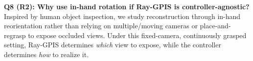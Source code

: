 \documentclass[conference]{IEEEtran}
\newcommand{\newparagraph}[1]{{\bf #1.}}
\begin{document}
\textbf{Q8 (R2): Why use in-hand rotation if Ray-GPIS is controller-agnostic?}
Inspired by human object inspection, we study reconstruction through in-hand reorientation rather than relying on multiple/moving cameras or place-and-regrasp to expose occluded views. Under this fixed-camera, continuously grasped setting, Ray-GPIS determines \emph{which} view to expose, while the controller determines \emph{how} to realize it.



{\small }
\end{document}
